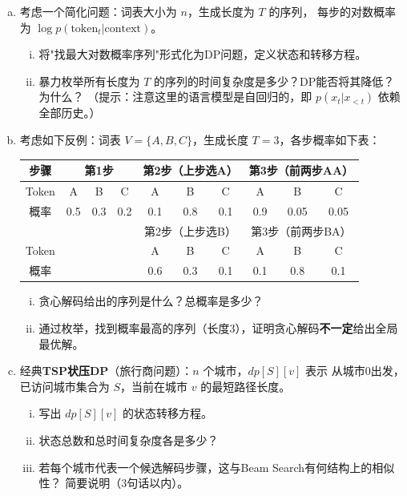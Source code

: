 \documentclass[12pt, a4paper]{ctexart}
\begin{document}
\begin{enumerate}[(a)]
    \item 考虑一个简化问题：词表大小为 $n$，生成长度为 $T$ 的序列，
    每步的对数概率为 $\log p(\text{token}_t | \text{context})$。
    \begin{enumerate}[i.]
        \item 将"找最大对数概率序列"形式化为DP问题，定义状态和转移方程。
        \item 暴力枚举所有长度为 $T$ 的序列的时间复杂度是多少？DP能否将其降低？为什么？
        （提示：注意这里的语言模型是自回归的，即 $p(x_t | x_{<t})$ 依赖全部历史。）
    \end{enumerate}

    \item 考虑如下反例：词表 $V = \{A, B, C\}$，生成长度 $T=3$，各步概率如下表：

    \begin{center}
    \begin{tabular}{c|ccc|ccc|ccc}
    \toprule
    步骤 & \multicolumn{3}{c|}{第1步} & \multicolumn{3}{c|}{第2步（上步选A）} & \multicolumn{3}{c}{第3步（前两步AA）} \\
    \midrule
    Token & A & B & C & A & B & C & A & B & C \\
    概率   & 0.5 & 0.3 & 0.2 & 0.1 & 0.8 & 0.1 & 0.9 & 0.05 & 0.05 \\
    \midrule
    & \multicolumn{3}{c|}{} & \multicolumn{3}{c|}{第2步（上步选B）} & \multicolumn{3}{c}{第3步（前两步BA）} \\
    \midrule
    Token & & & & A & B & C & A & B & C \\
    概率   & & & & 0.6 & 0.3 & 0.1 & 0.1 & 0.8 & 0.1 \\
    \bottomrule
    \end{tabular}
    \end{center}

    \begin{enumerate}[i.]
        \item 贪心解码给出的序列是什么？总概率是多少？
        \item 通过枚举，找到概率最高的序列（长度3），证明贪心解码\textbf{不一定}给出全局最优解。
    \end{enumerate}

    \item 经典\textbf{TSP状压DP}（旅行商问题）：$n$ 个城市，$dp[S][v]$ 表示
    从城市0出发，已访问城市集合为 $S$，当前在城市 $v$ 的最短路径长度。
    \begin{enumerate}[i.]
        \item 写出 $dp[S][v]$ 的状态转移方程。
        \item 状态总数和总时间复杂度各是多少？
        \item 若每个城市代表一个候选解码步骤，这与Beam Search有何结构上的相似性？
        简要说明（3句话以内）。
    \end{enumerate}
\end{enumerate}
\end{document}
